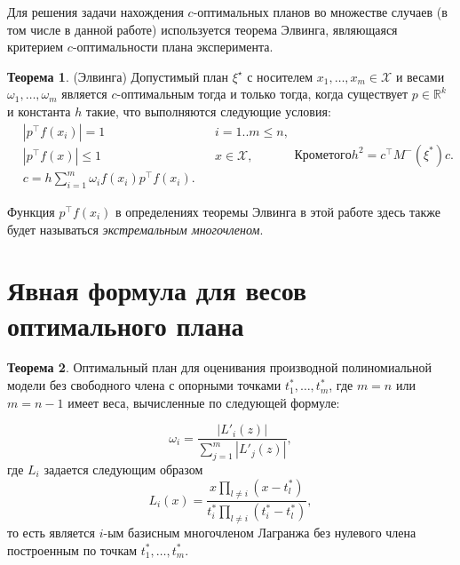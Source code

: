 \documentclass[specialist,
               substylefile = spbu.rtx,
               subf,href,colorlinks=true, 12pt]{disser}
\theoremstyle{definition}
\newtheorem{theorem}{Теорема}
\newcommand\abs[1]{\left\lvert#1\right\rvert}
\begin{document}
  Для решения задачи нахождения $c$-оптимальных планов во множестве случаев (в том числе в данной работе) используется теорема Элвинга, являющаяся критерием $c$-оптимальности плана эксперимента.
  \begin{theorem}
  \label{th:elfving}
  (Элвинга) \cite{melas2010}
  Допустимый план $\xi^\star$ с носителем $x_1, \ldots, x_m \in \mathcal{X}$ и весами $\omega_1, \ldots, \omega_m$ является $c$-оптимальным тогда и только тогда, когда существует $p \in \mathbb{R}^k$ и константа $h$ такие, что выполняются следующие условия:
  \begin{subequations}
  \label{eq:elfving}
  \begin{align}
	&\abs{p^\top f(x_i)} = 1 &&i=1..m \leqslant n \label{eq:elfving:eq1} ,\\
	&\abs{p^\top f(x)} \leqslant 1  &&x \in \mathcal{X} \label{eq:elfving:eq2} ,\\
	&c = h \sum_{i=1}^m \omega_i f(x_i) p^\top f(x_i) \label{eq:elfving:eq3}.
  \end{align}
  Кроме того
  \begin{equation*}
  	h^2 = c^\top M^{-}(\xi^{*})c.
  \end{equation*}
  \end{subequations}
  \end{theorem}
	Функция $p^\top f(x_i)$ в определениях теоремы Элвинга в этой работе здесь также будет называться \textit{экстремальным многочленом}.
	
	\section{Явная формула для весов оптимального плана}
	
	\begin{theorem} \cite{melasmain}
	\label{th:weights}
	Оптимальный план для оценивания производной полиномиальной модели без свободного члена с опорными точками $t_1^*, \ldots, t_m^*$, где $m=n$ или $m=n-1$ имеет веса, вычисленные по следующей формуле:	
	
	\begin{equation}
	\label{eq:weights}
		\omega_i = \frac{\abs{L'_i(z)}}{\sum_{j=1}^m \abs{L'_j(z)}},
	\end{equation}
	где $L_i$ задается следующим образом
	\begin{equation}
		\label{eq:lagr}
		L_{i}(x) = \frac{x \prod_{l \neq i} (x - t_l^*)}{t_i^* \prod_{l \neq i} (t_i^* - t_l^*)},
	\end{equation}	
	то есть является $i$-ым базисным многочленом Лагранжа без нулевого члена построенным по точкам $t_1^*, \ldots, t_m^*$.
	\end{theorem}
	
\end{document}
